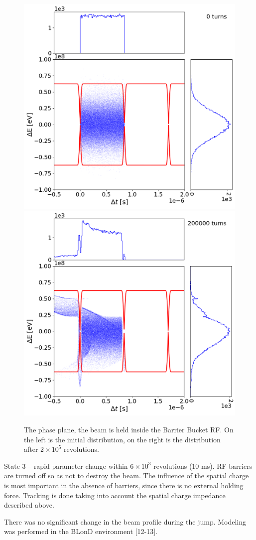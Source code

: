 \documentclass[
aps,%
12pt,%
final,%
notitlepage,%
oneside,%
onecolumn,%
nobibnotes,%
nofootinbib,%
superscriptaddress,%
noshowpacs,%
centertags]%
{revtex4}
\begin{document}
\begin{figure}
\setcaptionmargin{5mm}
   \includegraphics*[width=.49\columnwidth]{img/fig_08-1}
   \includegraphics*[width=.49\columnwidth]{img/fig_08-2}
\caption{The phase plane, the beam is held inside the Barrier Bucket RF. On the left is the initial distribution, on the right is the distribution after $2\times{10}^5$ revolutions.}
\label{fig:exp}
\end{figure}

\par State 3 – rapid parameter change within $6\times{10}^3$ revolutions ($10$ ms). RF barriers are turned off so as not to destroy the beam. The influence of the spatial charge is most important in the absence of barriers, since there is no external holding force. Tracking is done taking into account the spatial charge impedance described above.

\par There was no significant change in the beam profile during the jump. Modeling was performed in the BLonD environment [12-13].
\end{document}

